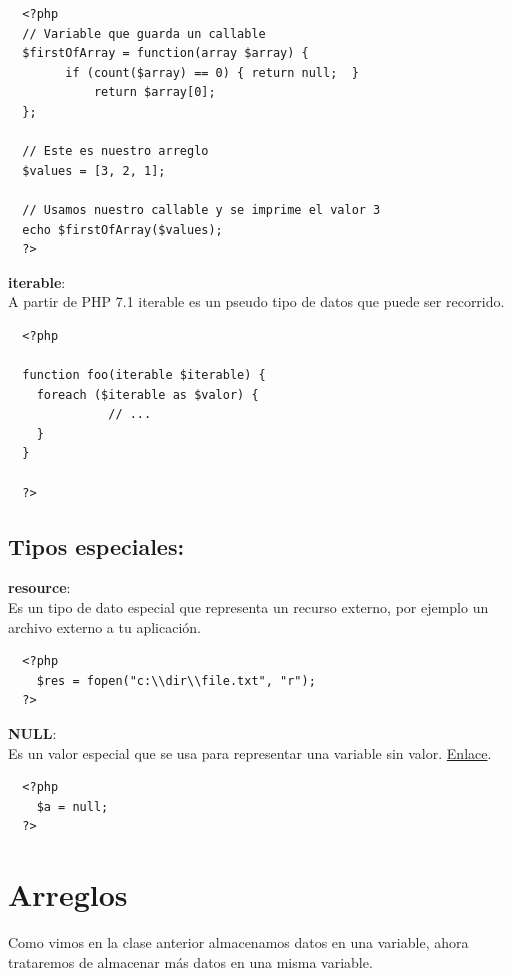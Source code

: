 \documentclass{article}
\begin{document}
\begin{verbatim}
  <?php
  // Variable que guarda un callable
  $firstOfArray = function(array $array) {
        if (count($array) == 0) { return null;  }
            return $array[0];
  };

  // Este es nuestro arreglo
  $values = [3, 2, 1];

  // Usamos nuestro callable y se imprime el valor 3
  echo $firstOfArray($values);
  ?>
\end{verbatim}

\textbf{iterable}:\\
A partir de PHP 7.1 iterable es un pseudo tipo de datos que puede ser
recorrido.\\

\begin{verbatim}
  <?php

  function foo(iterable $iterable) {
    foreach ($iterable as $valor) {
              // ...
    }
  }

  ?>
\end{verbatim}

\subsection*{Tipos especiales:}%
\textbf{resource}:\\
Es un tipo de dato especial que representa un recurso externo, por ejemplo un
archivo externo a tu aplicación.\\

\begin{verbatim}
  <?php
    $res = fopen("c:\\dir\\file.txt", "r");
  ?>
\end{verbatim}

\textbf{NULL}:\\
Es un valor especial que se usa para representar una variable sin valor.
\href{http://php.net/manual/es/language.types.null.php}{Enlace}.\\

\begin{verbatim}
  <?php
    $a = null;
  ?>
\end{verbatim}

\newpage

\section{Arreglos}%
Como vimos en la clase anterior almacenamos datos en una variable, ahora
trataremos de almacenar más datos en una misma variable.\\
\end{document}
